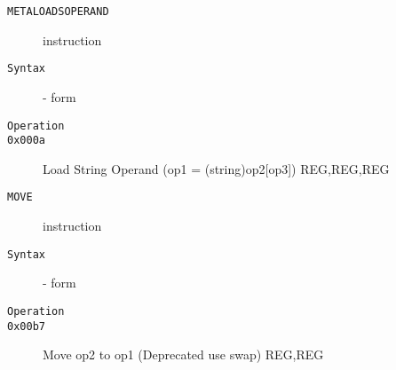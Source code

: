 \clearpage
\begin{description}
\item[\texttt{METALOADSOPERAND}] instruction\\
\item[\texttt{Syntax}] - form \\

\item[\texttt{Operation}]
\item[\texttt{}]
\item[\texttt{0x000a}]       Load String Operand (op1 = (string)op2[op3])  {REG,REG,REG} \\
\end{description}
\clearpage
\begin{description}
\item[\texttt{MOVE}] instruction\\
\item[\texttt{Syntax}] - form \\

\item[\texttt{Operation}]
\item[\texttt{}]
\item[\texttt{0x00b7}] Move op2 to op1 (Deprecated use swap)  {REG,REG}           \\
\end{description}
\clearpage
